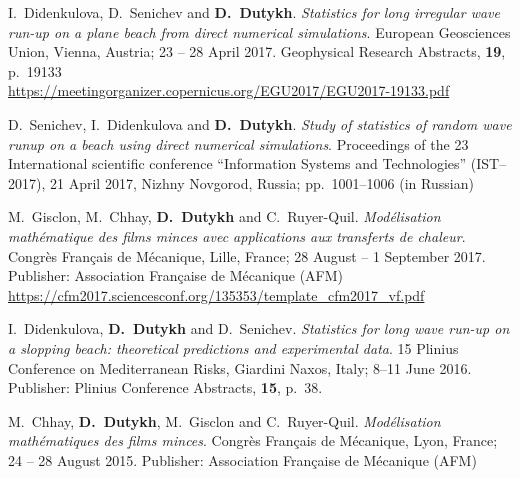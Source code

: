 \begin{etaremune}


  \item I.~Didenkulova, D.~Senichev and \textbf{D.~Dutykh}. \textit{Statistics for long irregular wave run-up on a plane beach from direct numerical simulations}. European Geosciences Union, Vienna, Austria; 23 -- 28 April 2017. Geophysical Research Abstracts, \textbf{19}, p.~19133 \\ %
  \url{https://meetingorganizer.copernicus.org/EGU2017/EGU2017-19133.pdf}
  
  \item D.~Senichev, I.~Didenkulova and \textbf{D.~Dutykh}. \textit{Study of statistics of random wave runup on a beach using direct numerical simulations}. Proceedings of the 23 International scientific conference ``Information Systems and Technologies'' (IST--2017), 21 April 2017, Nizhny Novgorod, Russia; pp.~1001--1006 (in Russian) %
  
  \item M.~Gisclon, M.~Chhay, \textbf{D.~Dutykh} and C.~Ruyer-Quil. \textit{Mod\'elisation math\'ematique des films minces avec applications aux transferts de chaleur}. Congr\`es Fran\c{c}ais de M\'ecanique, Lille, France; 28 August -- 1 September 2017. Publisher: Association Fran\c{c}aise de M\'ecanique (AFM) \\ %
  \url{https://cfm2017.sciencesconf.org/135353/template_cfm2017_vf.pdf}
  

  
  \item I.~Didenkulova, \textbf{D.~Dutykh} and D.~Senichev. \textit{Statistics for long wave run-up on a slopping beach: theoretical predictions and experimental data}. 15 Plinius Conference on Mediterranean Risks, Giardini Naxos, Italy; 8--11 June 2016. Publisher: Plinius Conference Abstracts, \textbf{15}, p.~38. %

  

  
  \item M.~Chhay, \textbf{D.~Dutykh}, M.~Gisclon and C.~Ruyer-Quil. \textit{Mod\'elisation math\'ematiques des films minces}. Congr\`es Fran\c{c}ais de M\'ecanique, Lyon, France; 24 -- 28 August 2015. Publisher: Association Fran\c{c}aise de M\'ecanique (AFM) \\ %
  

\end{etaremune}
